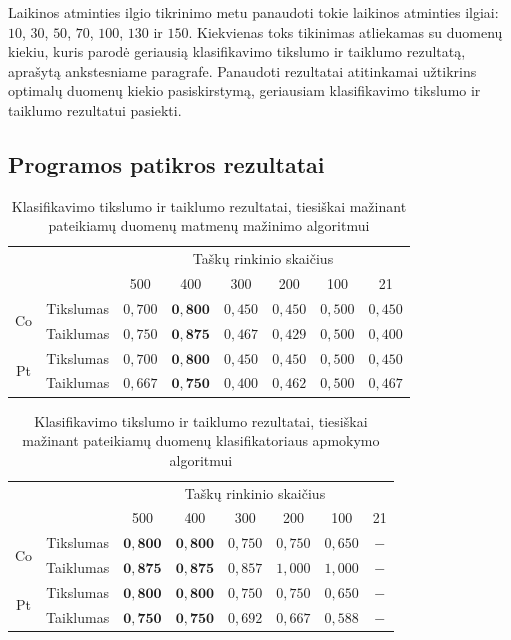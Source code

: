 \documentclass[]{vgtuef}
\begin{document}
Laikinos atminties ilgio tikrinimo metu panaudoti tokie laikinos atminties ilgiai: $10$, $30$, $50$, $70$, $100$, $130$ ir $150$. Kiekvienas toks tikinimas atliekamas su duomenų kiekiu, kuris parodė geriausią klasifikavimo tikslumo ir taiklumo rezultatą, aprašytą ankstesniame paragrafe. Panaudoti rezultatai atitinkamai užtikrins optimalų duomenų kiekio pasiskirstymą, geriausiam klasifikavimo tikslumo ir taiklumo rezultatui pasiekti.


\subsection{Programos patikros rezultatai}
\begin{table}
	\centering
	\renewcommand{\arraystretch}{1.3}
	\caption{Klasifikavimo tikslumo ir taiklumo rezultatai, tiesiškai mažinant pateikiamų duomenų matmenų mažinimo algoritmui}
	\label{table:first_phase_experiment}
	\begin{tabular}{|c|c|c|c|c|c|c|c|} \hline
			& & \multicolumn{6}{c|}{Taškų rinkinio skaičius} \\ \cline{3-8}
						&	& 500 	& 400	& 300 	& 200 & 100 	& 21 	\\ \hline
		\multirow{2}{*}{Co}
		& Tikslumas	& $0,700$ & $\mathbf{0,800}$ & $0,450$ & $0,450$ & $0,500$ & $0,450$ \\ \cline{2-8}
		& Taiklumas  &	$0,750$ & $\mathbf{0,875}$ & $0,467$ & $0,429$ & $0,500$ & $0,400$ \\ \hline
		\multirow{2}{*}{Pt}
		& Tikslumas	& $0,700$ & $\mathbf{0,800}$ & $0,450$ & $0,450$ & $0,500$ & $0,450$ \\ \cline{2-8}
		& Taiklumas  &	$0,667$ & $\mathbf{0,750}$ & $0,400$ & $0,462$ & $0,500$ & $0,467$ \\ \hline
	\end{tabular}
\end{table}

\begin{table}
	\centering
	\renewcommand{\arraystretch}{1.3}
	\caption{Klasifikavimo tikslumo ir taiklumo rezultatai, tiesiškai mažinant pateikiamų duomenų klasifikatoriaus apmokymo algoritmui}
	\label{table:second_phase_experiment}
	\begin{tabular}{|c|c|c|c|c|c|c|c|} \hline
			& & \multicolumn{6}{c|}{Taškų rinkinio skaičius} \\ \cline{3-8}
						&	& 500 	& 400	& 300 	& 200 & 100 	& 21 	\\ \hline
		\multirow{2}{*}{Co}
		& Tikslumas	& $\mathbf{0,800}$ & $\mathbf{0,800}$ & $0,750$ & $0,750$ & $0,650$ & $-$ \\ \cline{2-8}
		& Taiklumas  &	$\mathbf{0,875}$ & $\mathbf{0,875}$ & $0,857$ & $1,000$ & $1,000$ & $-$ \\ \hline
		\multirow{2}{*}{Pt}
		& Tikslumas	& $\mathbf{0,800}$ & $\mathbf{0,800}$ & $0,750$ & $0,750$ & $0,650$ & $-$ \\ \cline{2-8}
		& Taiklumas  &	$\mathbf{0,750}$ & $\mathbf{0,750}$ & $0,692$ & $0,667$ & $0,588$ & $-$ \\ \hline
	\end{tabular}
\end{table}
\end{document}
